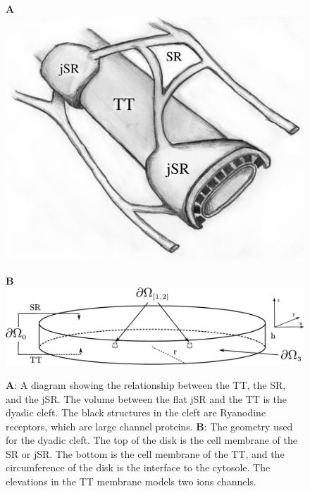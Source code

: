 \newcommand{\figheight}{3.5cm}
\begin{figure}[t]
  \centering
  \begin{minipage}[t]{0.35\linewidth}
    \large \textbf{A}\\
    \includegraphics[width=\linewidth]{chapters/hake/pdf/SR_TT}
  \end{minipage}
  \begin{minipage}[t]{0.64\linewidth}
    \large \textbf{B}\\
    \includegraphics[width=\linewidth]{chapters/hake/pdf/disk}
  \end{minipage}
  \caption{\textbf{A}: A diagram showing the relationship between the TT, the SR, and the jSR. The volume between the flat jSR and the TT is the dyadic cleft. The black structures in the cleft are Ryanodine receptors, which are large channel proteins. \textbf{B}: The geometry used for the dyadic cleft. The top of the disk is the cell membrane of the SR or jSR. The bottom is the cell membrane of the TT, and the circumference of the disk is the interface to the cytosole. The elevations in the TT membrane models two ions channels.}
\label{fig:morphology}
\end{figure}


